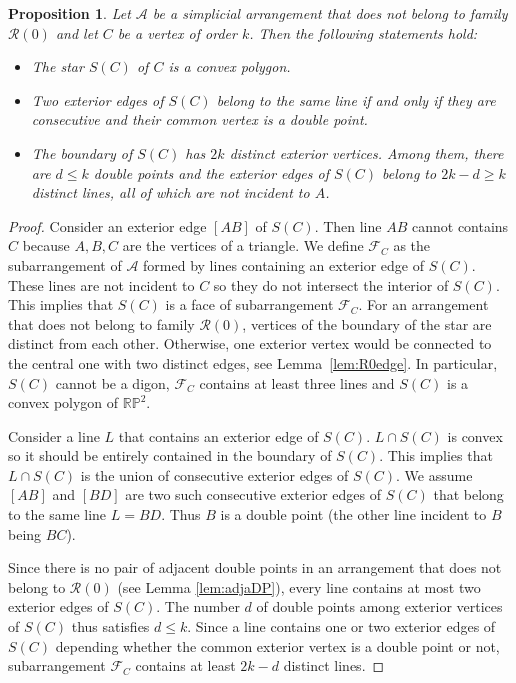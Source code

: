 \documentclass[a4paper,11pt,reqno]{amsart}
\newtheorem{prop}[thm]{Proposition}
\theoremstyle{definition}
\theoremstyle{remark}
\theoremstyle{definition}
\theoremstyle{definition}
\theoremstyle{definition}
\numberwithin{equation}{section}
\begin{document}
\begin{prop}\label{prop:star1}
Let $\mathcal{A}$ be a simplicial arrangement that does not belong to family $\mathcal{R}(0)$ and let $C$ be a vertex of order $k$. Then the following statements hold:
\begin{itemize}
    \item The star $S(C)$ of $C$ is a convex polygon.
    \item Two exterior edges of $S(C)$ belong to the same line if and only if they are consecutive and their common  vertex is a double point.
    \item The boundary of $S(C)$ has $2k$ distinct exterior vertices. Among them, there are $d \leq k$ double points and the exterior edges of $S(C)$ belong to $2k-d \geq k$ distinct lines, all of which are not incident to $A$.
\end{itemize}
\end{prop}

\begin{proof}
Consider an exterior edge $[AB]$ of $S(C)$. Then line $AB$ cannot contains $C$ because $A,B,C$ are the vertices of a triangle. We define $\mathcal{F}_{C}$ as the subarrangement of $\mathcal{A}$ formed by lines containing an exterior edge of $S(C)$. These lines are not incident to $C$ so they do not intersect the interior of $S(C)$. This implies that $S(C)$ is a face of subarrangement $\mathcal{F}_{C}$. For an arrangement that does not belong to family $\mathcal{R}(0)$, vertices of the boundary of the star are distinct from each other. Otherwise, one exterior vertex would be connected to the central one with two distinct edges, see Lemma~\ref{lem:R0edge}. In particular, $S(C)$ cannot be a digon, $\mathcal{F}_{C}$ contains at least three lines and $S(C)$ is a convex polygon of $\mathbb{RP}^{2}$.
\par
Consider a line $L$ that contains an exterior edge of $S(C)$. $L \cap S(C)$ is convex so it should be entirely contained in the boundary of $S(C)$. This implies that $L \cap S(C)$ is the union of consecutive exterior edges of $S(C)$. We assume $[AB]$ and $[BD]$ are two such consecutive exterior edges of $S(C)$ that belong to the same line $L=BD$. Thus $B$ is a double point (the other line incident to $B$ being $BC$).
\par
Since there is no pair of adjacent double points in an arrangement that does not belong to $\mathcal{R}(0)$ (see Lemma \ref{lem:adjaDP}), every line contains at most two exterior edges of $S(C)$. The number $d$ of double points among exterior vertices of $S(C)$ thus satisfies $d \leq k$. Since a line contains one or two exterior edges of $S(C)$ depending whether the common exterior vertex is a double point or not, subarrangement $\mathcal{F}_{C}$ contains at least $2k-d$ distinct lines.
\end{proof}
\end{document}
